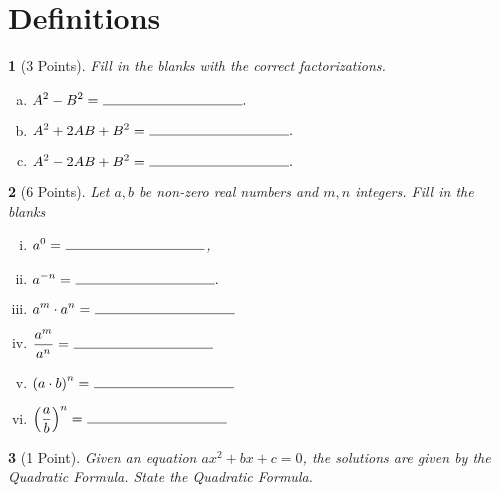 \documentclass[12pt]{amsart}
\begin{document}
\theoremstyle{plain}
\newtheorem{thm}{}
\newtheorem{lem}{Lemma}
\theoremstyle{definition}
\newtheorem{defn}{Definition}

\newpage

\section{Definitions}
\begin{thm}[3 Points]
  Fill in the blanks with the correct factorizations.
  \begin{enumerate}[(a)]
  \item
    $\displaystyle{A^2 - B^2 =\ \line(1,0){100}}.$
    \vspace{.3in}
  \item
    $\displaystyle{A^2 + 2AB + B^2 =\ \line(1,0){100}}.$
    \vspace{.3in}
  \item
    $\displaystyle{A^2 - 2AB + B^2 =\ \line(1,0){100}}.$
    \vspace{.3in}
  \end{enumerate}
\end{thm}

\vspace{1in}
\begin{thm}[6 Points]
  Let $a, b$ be non-zero real numbers and $m, n$ integers.
  Fill in the blanks
  \vspace{.25in}
  \begin{enumerate}[(i)]
  \item
    $\displaystyle{a^0 =\ \line(1,0){100}}$,
    \vspace{.25in}
  \item
    $\displaystyle{a^{-n} =\ \line(1,0){100}}.$
    \vspace{.25in}
  \item
    $\displaystyle{a^m \cdot a^n =\ \line(1,0){100}}$
    \vspace{.25in}
  \item
    $\displaystyle{\frac{a^m}{a^n} = \ \line(1,0){100}}$
    \vspace{.25in}
  \item
    $\displaystyle{\left(a \cdot b\right)^n = \ \line(1,0){100}}$
    \vspace{.25in}
  \item
    $\displaystyle{\left(\frac{a}{b}\right)^n = \ \line(1,0){100}}$
  \end{enumerate}
\end{thm}

\newpage
\begin{thm}[1 Point]
  Given an equation $ax^2 + bx + c = 0$, the solutions are given by the Quadratic Formula.  State the Quadratic Formula.
  \vspace{2in}
\end{thm}
\end{document}
